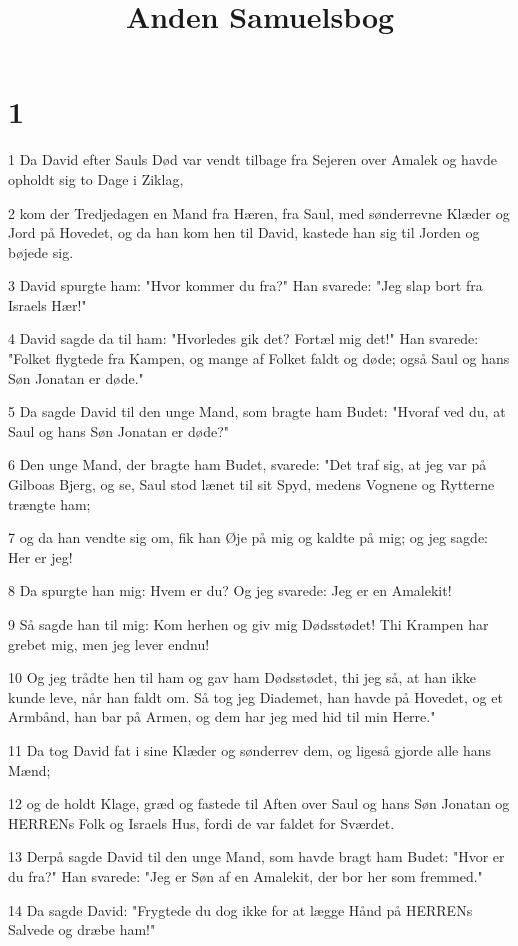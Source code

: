 

\title{Anden Samuelsbog}


\chapter{1}

\par 1 Da David efter Sauls Død var vendt tilbage fra Sejeren over Amalek og havde opholdt sig to Dage i Ziklag,
\par 2 kom der Tredjedagen en Mand fra Hæren, fra Saul, med sønderrevne Klæder og Jord på Hovedet, og da han kom hen til David, kastede han sig til Jorden og bøjede sig.
\par 3 David spurgte ham: "Hvor kommer du fra?" Han svarede: "Jeg slap bort fra Israels Hær!"
\par 4 David sagde da til ham: "Hvorledes gik det? Fortæl mig det!" Han svarede: "Folket flygtede fra Kampen, og mange af Folket faldt og døde; også Saul og hans Søn Jonatan er døde."
\par 5 Da sagde David til den unge Mand, som bragte ham Budet: "Hvoraf ved du, at Saul og hans Søn Jonatan er døde?"
\par 6 Den unge Mand, der bragte ham Budet, svarede: "Det traf sig, at jeg var på Gilboas Bjerg, og se, Saul stod lænet til sit Spyd, medens Vognene og Rytterne trængte ham;
\par 7 og da han vendte sig om, fik han Øje på mig og kaldte på mig; og jeg sagde: Her er jeg!
\par 8 Da spurgte han mig: Hvem er du? Og jeg svarede: Jeg er en Amalekit!
\par 9 Så sagde han til mig: Kom herhen og giv mig Dødsstødet! Thi Krampen har grebet mig, men jeg lever endnu!
\par 10 Og jeg trådte hen til ham og gav ham Dødsstødet, thi jeg så, at han ikke kunde leve, når han faldt om. Så tog jeg Diademet, han havde på Hovedet, og et Armbånd, han bar på Armen, og dem har jeg med hid til min Herre."
\par 11 Da tog David fat i sine Klæder og sønderrev dem, og ligeså gjorde alle hans Mænd;
\par 12 og de holdt Klage, græd og fastede til Aften over Saul og hans Søn Jonatan og HERRENs Folk og Israels Hus, fordi de var faldet for Sværdet.
\par 13 Derpå sagde David til den unge Mand, som havde bragt ham Budet: "Hvor er du fra?" Han svarede: "Jeg er Søn af en Amalekit, der bor her som fremmed."
\par 14 Da sagde David: "Frygtede du dog ikke for at lægge Hånd på HERRENs Salvede og dræbe ham!"
